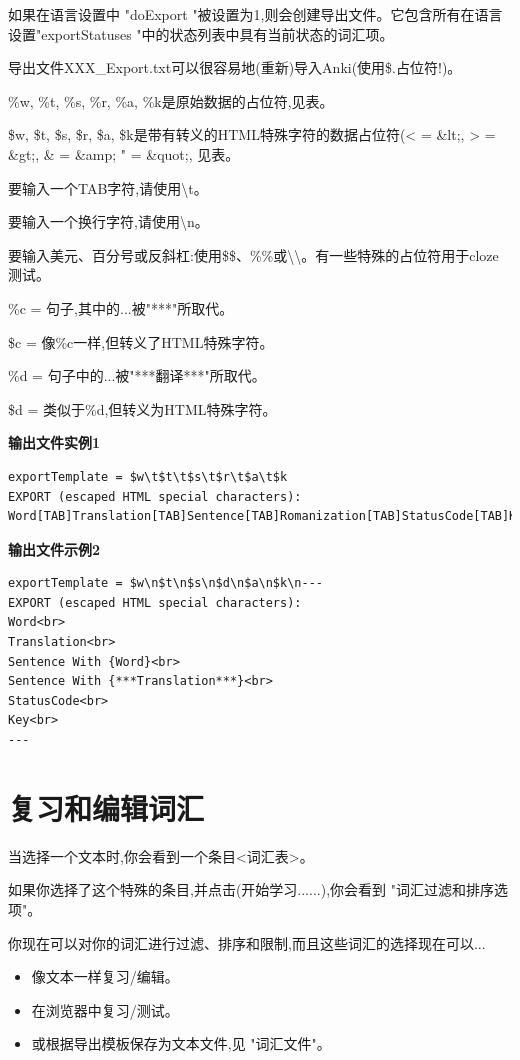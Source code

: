 \documentclass[cn,10pt,math=newtx,citestyle=gb7714-2015,bibstyle=gb7714-2015]{elegantbook}
\begin{document}
如果在语言设置中 "doExport "被设置为1,则会创建导出文件。它包含所有在语言设置"exportStatuses "中的状态列表中具有当前状态的词汇项。

导出文件XXX\_Export.txt可以很容易地(重新)导入Anki(使用\$.占位符!)。

\%w, \%t, \%s, \%r, \%a, \%k是原始数据的占位符,见表。

\$w, \$t, \$s, \$r, \$a, \$k是带有转义的HTML特殊字符的数据占位符(< = \&lt;, > = \&gt;, \& =
\&amp; " = \&quot;, 见表。

要输入一个TAB字符,请使用\textbackslash t。

要输入一个换行字符,请使用\textbackslash n。

要输入美元、百分号或反斜杠:使用\$\$、\%\%或\textbackslash\textbackslash。有一些特殊的占位符用于cloze测试。

\%c = 句子,其中的{...}被"{***}"所取代。

\$c = 像\%c一样,但转义了HTML特殊字符。

\%d = 句子中的{...}被"{***翻译***}"所取代。

\$d = 类似于\%d,但转义为HTML特殊字符。

\textbf{输出文件实例1}

\begin{lstlisting}
exportTemplate = $w\t$t\t$s\t$r\t$a\t$k
EXPORT (escaped HTML special characters):
Word[TAB]Translation[TAB]Sentence[TAB]Romanization[TAB]StatusCode[TAB]Key
\end{lstlisting}

\textbf{输出文件示例2}

\begin{lstlisting}
exportTemplate = $w\n$t\n$s\n$d\n$a\n$k\n---
EXPORT (escaped HTML special characters):
Word<br>
Translation<br>
Sentence With {Word}<br>
Sentence With {***Translation***}<br>
StatusCode<br>
Key<br>
---
\end{lstlisting}


\chapter{复习和编辑词汇}\label{复习和编辑词汇}
当选择一个文本时,你会看到一个条目<词汇表>。

如果你选择了这个特殊的条目,并点击(开始学习......),你会看到 "词汇过滤和排序选项"。

你现在可以对你的词汇进行过滤、排序和限制,而且这些词汇的选择现在可以...

\begin{itemize}
    \item 像文本一样复习/编辑。
     \item 在浏览器中复习/测试。
     \item 或根据导出模板保存为文本文件,见 "词汇文件"。
    
\end{itemize}
\end{document}
